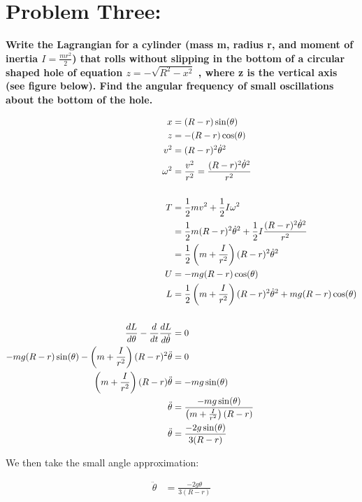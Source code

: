 \documentclass[10pt]{article} %
\begin{document}
\section{Problem Three: }
\textbf{Write the Lagrangian for a cylinder (mass m, radius r, and moment of inertia $I=\frac{mr^2}{2}$) that rolls without slipping in the bottom of a circular shaped hole of equation $z = −\sqrt{R^2 − x^2}$ , where z is the vertical axis (see figure below). Find the angular frequency of small oscillations about the bottom of the hole.}

\begin{align*}
  x &= (R-r)\sin(\theta)\\
  z &= -(R-r)\cos(\theta)\\
  v^2 &= (R-r)^2\dot{\theta}^2\\
  \omega^2 &= \frac{v^2}{r^2} = \frac{(R-r)^2\dot{\theta}^2}{r^2}\\
  \vspace{1cm}\\
  T &= \frac{1}{2}mv^2 + \frac{1}{2}I\omega^2\\
  &= \frac{1}{2}m(R-r)^2\dot{\theta}^2 + \frac{1}{2}I\frac{(R-r)^2\dot{\theta}^2}{r^2}\\
  &= \frac{1}{2}\left(m + \frac{I}{r^2}\right)(R-r)^2\dot{\theta}^2\\
  U &= -mg(R-r)\cos(\theta)\\
  L &= \frac{1}{2}\left(m + \frac{I}{r^2}\right)(R-r)^2\dot{\theta}^2 + mg(R-r)\cos(\theta)\\
  \vspace{1cm}\\
  \frac{dL}{d\theta} - \frac{d}{dt}\frac{dL}{d\dot{\theta}} &= 0\\
  -mg(R-r)\sin(\theta) - \left(m + \frac{I}{r^2}\right)(R-r)^2\ddot{\theta} &= 0\\
  \left(m + \frac{I}{r^2}\right)(R-r)\ddot{\theta} &= -mg\sin(\theta)\\
  \ddot{\theta} &= \frac{-mg\sin(\theta)}{\left(m + \frac{I}{r^2}\right)(R-r)}\\
  \ddot{\theta} &= \frac{-2g\sin(\theta)}{3(R-r)}\\
\end{align*}

We then take the small angle approximation:

\begin{align*}
  \ddot{\theta} &= \frac{-2g\theta}{3(R-r)}\\
\end{align*}
\end{document}
